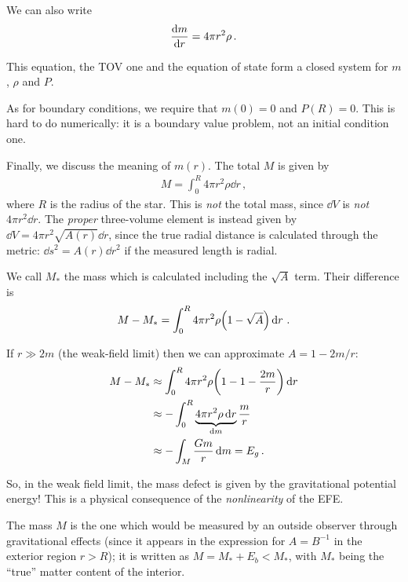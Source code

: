 \documentclass[main.tex]{subfiles}
\begin{document}
We can also write 
%
\begin{align}
\dv{m}{r} = 4 \pi r^2 \rho 
\,.
\end{align}

This equation, the TOV one and the equation of state form a closed system for \(m\), \(\rho \) and \(P\). 

As for boundary conditions, we require that \(m(0) = 0\) and \(P(R) = 0\). 
This is hard to do numerically: it is a boundary value problem, not an initial condition one. 

Finally, we discuss the meaning of \(m(r)\). 
The total \(M\) is given by 
%
\begin{align}
M = \int_{0}^{R} 4 \pi r^2 \rho \dd{r}
\,,
\end{align}
%
where \(R\) is the radius of the star. This is \emph{not} the total mass, since \(\dd{V}\) is \emph{not} \(4 \pi r^2 \dd{r}\). 
The \emph{proper} three-volume element is instead given by \(\dd{V} = 4 \pi r^2 \sqrt{A(r)} \dd{r}\), since the true radial distance is calculated through the metric: \(\dd{s^2} = A(r) \dd{r^2}\) if the measured length is radial. 

We call \(M_*\) the mass which is calculated including the \(\sqrt{A}\) term. Their difference is 
%
\begin{align}
M - M_* = \int_{0}^{R} 4 \pi r^2 \rho \qty(1 - \sqrt{A}) \dd{r}
\,.
\end{align}
 
If \(r \gg 2m\) (the weak-field limit) then we can approximate \(A = 1 - 2m /r\):
%
\begin{align}
M - M_* &\approx \int_{0}^{R} 4 \pi r^2 \rho \qty(1 - 1 - \frac{2m}{r}) \dd{r}    \\
&\approx - \int_{0}^{R} \underbrace{4 \pi r^2 \rho \dd{r}}_{ \dd{m}} \frac{m}{r}   \\
&\approx - \int_{M} \frac{Gm}{r} \dd{m} = E_g
\,.
\end{align}

So, in the weak field limit, the mass defect is given by the gravitational potential energy! 
This is a physical consequence of the \emph{nonlinearity} of the EFE. 

The mass \(M\) is the one which would be measured by an outside observer through gravitational effects (since it appears in the expression for \(A = B^{-1}\) in the exterior region \(r > R\)); it is written as \(M = M_* + E_b < M_*\), with \(M_*\) being the ``true'' matter content of the interior. 
\end{document}
